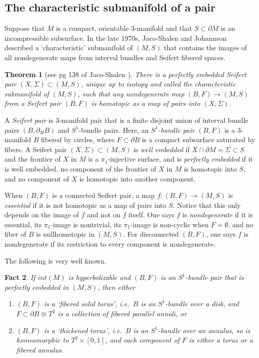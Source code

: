 \documentclass[12pt]{amsart}
\newtheorem{theorem}{Theorem}[section] \newtheorem{philosophy}{Statement}[theorem]
\newtheorem{fact}[theorem]{Fact}
\theoremstyle{definition}
\theoremstyle{remark}
\begin{document}
\subsection{The characteristic submanifold of a pair} 
\label {sec:characteristic} Suppose that $M $ is a compact, orientable $3$-manifold and that $S \subset\partial M$  is an incompressible subsurface. In the late 1970s, Jaco-Shalen \cite{Jacoseifert} and Johannson \cite{Johannsonhomotopy} described a `characteristic' 
submanifold of $(M,S)$ that contains the images of all nondegenerate maps from interval bundles and Seifert fibered spaces. 

\begin{theorem}[see pg 138 of Jaco-Shalen \cite{Jacolectures}]\label{charsubthm}
There is a perfectly embedded Seifert pair $(X,\Sigma) \subset (M,S)$, unique up to isotopy and called the \emph {characteristic submanifold} of $(M,S)$,  such that any nondegenerate map $(B,F)\longrightarrow (M,S)$ from a Seifert pair $(B,F)$  is homotopic as a map of pairs into $(X,\Sigma)$. 
\end{theorem}

A \emph{Seifert pair} is $3$-manifold pair that is a finite disjoint union of interval bundle pairs $(B,\partial_H B)$ and $S^1$-bundle pairs. Here, an \emph{$S^1$-bundle pair} $(B,F)$ is a $3$-manifold $B$ fibered by circles, where $F \subset \partial B$ is a compact subsurface saturated by fibers. A Seifert pair $(X,\Sigma) \subset (M,S)$ is \emph{well embedded} if $X \cap \partial M =\Sigma \subset S$ and the frontier of $X$ in $M$ is a $\pi_1$-injective surface, and is \emph{perfectly embedded} if it is well embedded, no component of the frontier of $X$ in $M$ is homotopic into $S$, and no component of $X$ is homotopic into another component.

When $(B,F)$ is a connected Seifert pair, a map $f: (B,F)\longrightarrow (M,S)$ is \emph{essential} if it is not homotopic as a map of pairs into $S$. Notice that this only depends on the image of $f$ and not on $f$ itself. One says $f$ is \emph{nondegenerate} if it is essential, its $\pi_1$-image is nontrivial, its $\pi_1$-image is non-cyclic when $F=\emptyset$, and no fiber of $B$ is nullhomotopic in $(M,S)$. For disconnected $(B,F)$, one says $f$ is nondegenerate if its restriction to every component is nondegenerate.

\medskip

The following is very well known.

\begin{fact} If $int(M)$ is hyperbolizable and $(B,F)$ is an $S^1$-bundle pair that is perfectly embedded in $(M,S)$, then either 
\begin{enumerate}
\item $(B,F)$ is a `fibered solid torus', i.e.\ $B$ is an $S^1$-bundle over a disk, and $F \subset \partial B \cong T^2$ is a collection of fibered parallel annuli, or
\item $(B,F)$ is a `thickened torus', i.e.\ $B$ is an $S^1$-bundle over an annulus, so is homeomorphic to $T^2 \times [0,1]$, and each component of $F$ is either a torus or a fibered annulus.
\end{enumerate}\label{comps of char}
\end{fact}
\end{document}
